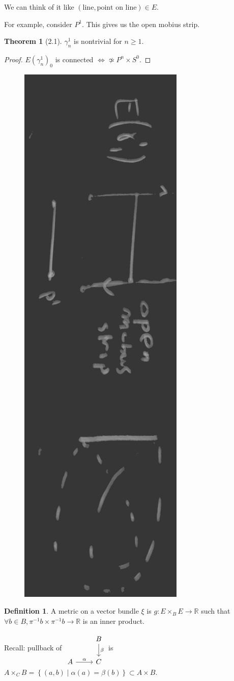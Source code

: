 \documentclass{article}
\theoremstyle{definition}
\newtheorem*{definition}{Definition}
\newtheorem{theorem}{Theorem}
\begin{document}
    We can think of it like \((\text{line}, \text{point on line}) \in E\).
    
    For example, consider \(P^1\). This gives us the open mobius strip.

    \begin{theorem}
        [2.1] \(\gamma_n^1\) is nontrivial for \(n \geq 1\).
    \end{theorem}

    \begin{proof}
        \(E(\gamma_n^1)_0\) is connected \(\iff \not\simeq P^n \times S^0\).
    \end{proof}

    \begin{figure}[H]
        \centering
        \includegraphics[height=0.8\textwidth, angle=90]{img/gamma11.pdf}
        \caption{}
    \end{figure}

    \begin{definition}
        A metric on a vector bundle \(\xi \) is \(g: E \times_B E \to \mathbb{R}\) such that \(\forall b\in B, \pi ^{-1} b \times \pi ^{-1} b \to \mathbb{R}\) is an inner product.
    \end{definition}

    Recall: pullback of \(\begin{tikzcd}
        & B\ar[d,"\beta"] \\ A \ar[r,"\alpha"] & C
    \end{tikzcd}\) is \(A \times_C B = \left\{ (a,b) \mid \alpha (a) = \beta(b) \right\} \subset A \times B\).
\end{document}
